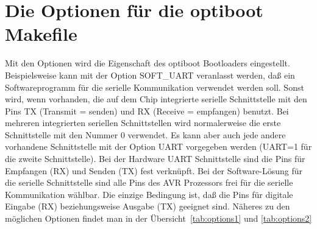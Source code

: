 \section{Die Optionen für die optiboot Makefile}

Mit den Optionen wird die Eigenschaft des optiboot Bootloaders eingestellt.
Beispielsweise kann mit der Option SOFT\_UART veranlasst werden, daß ein
Softwareprogramm für die serielle Kommunikation verwendet werden soll.
Sonst wird, wenn vorhanden, die auf dem Chip integrierte  serielle Schnittstelle
mit den Pins TX (Transmit = senden) und RX (Receive = empfangen) benutzt.
Bei mehreren integrierten seriellen Schnittstellen wird normalerweise die erste
Schnittstelle mit den Nummer 0 verwendet. Es kann aber auch jede andere vorhandene
Schnittstelle mit der Option UART vorgegeben werden (UART=1 für die zweite Schnittstelle).
Bei der Hardware UART Schnittstelle sind die Pins für Empfangen (RX) und Senden (TX)
fest verknüpft. Bei der Software-Lösung für die serielle Schnittstelle sind alle Pins
des AVR Prozessors frei für die serielle Kommunikation wählbar. Die einzige Bedingung
ist, daß die Pins für digitale Eingabe (RX) beziehungsweise Ausgabe (TX) geeignet sind.
Näheres zu den möglichen Optionen findet man in der Übersicht~\ref{tab:options1}
und \ref{tab:options2}

